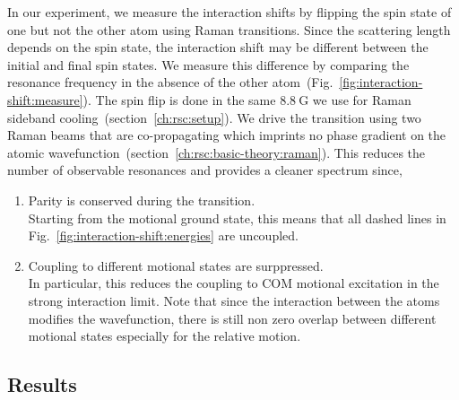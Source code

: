 In our experiment, we measure the interaction shifts by flipping the spin state of
one but not the other atom using Raman transitions.
Since the scattering length depends on the spin state,
the interaction shift may be different between the initial and final spin states.
We measure this difference by comparing the resonance frequency in the absence of
the other atom~(Fig.~\ref{fig:interaction-shift:measure}).
The spin flip is done in the same $8.8~\mathrm{G}$ we use for
Raman sideband cooling~(section~\ref{ch:rsc:setup}).
We drive the transition using two Raman beams that are co-propagating
which imprints no phase gradient on
the atomic wavefunction~(section~\ref{ch:rsc:basic-theory:raman}).
This reduces the number of observable resonances and provides a cleaner spectrum since,
\begin{enumerate}
\item Parity is conserved during the transition.\\
  Starting from the motional ground state, this means that all dashed lines in
  Fig.~\ref{fig:interaction-shift:energies} are uncoupled.
\item Coupling to different motional states are surppressed.\\
  In particular, this reduces the coupling to COM motional excitation
  in the strong interaction limit.
  Note that since the interaction between the atoms modifies the wavefunction,
  there is still non zero overlap between different motional states
  especially for the relative motion.
\end{enumerate}

\subsection{Results}
\label{ch:interaction-shift:spectroscopy:results}

